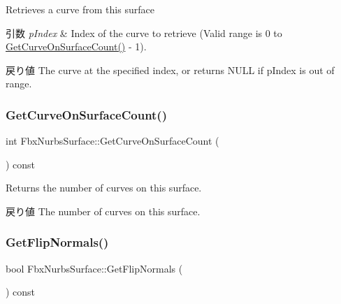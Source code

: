 Retrieves a curve from this surface 
\begin{DoxyParams}{引数}
{\em p\+Index} & Index of the curve to retrieve (Valid range is 0 to \hyperlink{class_fbx_nurbs_surface_aeb1717a47a9bfe18ebe190d22507f3a7}{Get\+Curve\+On\+Surface\+Count()} -\/ 1). \\
\hline
\end{DoxyParams}
\begin{DoxyReturn}{戻り値}
The curve at the specified index, or returns N\+U\+LL if p\+Index is out of range. 
\end{DoxyReturn}
\mbox{\label{class_fbx_nurbs_surface_aeb1717a47a9bfe18ebe190d22507f3a7}} 
\subsubsection{\texorpdfstring{Get\+Curve\+On\+Surface\+Count()}{GetCurveOnSurfaceCount()}}
{\footnotesize\ttfamily int Fbx\+Nurbs\+Surface\+::\+Get\+Curve\+On\+Surface\+Count (\begin{DoxyParamCaption}{ }\end{DoxyParamCaption}) const}

Returns the number of curves on this surface. \begin{DoxyReturn}{戻り値}
The number of curves on this surface. 
\end{DoxyReturn}
\mbox{\label{class_fbx_nurbs_surface_a6152d497e060bcfbab110748e7aa6839}} 
\subsubsection{\texorpdfstring{Get\+Flip\+Normals()}{GetFlipNormals()}}
{\footnotesize\ttfamily bool Fbx\+Nurbs\+Surface\+::\+Get\+Flip\+Normals (\begin{DoxyParamCaption}{ }\end{DoxyParamCaption}) const}

\mbox{\label{class_fbx_nurbs_surface_a677c5bf162fa6186aaec305ff840c6e6}} 
